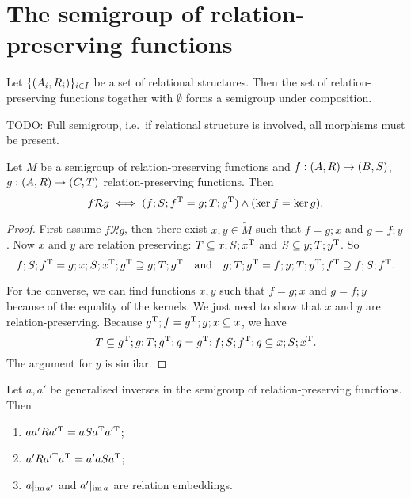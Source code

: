 \section{The semigroup of relation-preserving functions}
\begin{lemma}
Let $\{\sSet{A_i, R_i}\}_{i\in I}$ be a set of relational structures. Then the set of relation-preserving functions together with $\emptyset$ forms a semigroup under composition.
\end{lemma}


TODO: Full semigroup, i.e.\ if relational structure is involved, all morphisms must be present.
\begin{proposition}
Let $M$ be a semigroup of relation-preserving functions and $f: \sSet{A, R} \to \sSet{B,S}$, $g: \sSet{A, R} \to \sSet{C,T}$ relation-preserving functions. Then
\[ f\mathcal{R}g \iff (f;S;f^{\mathrm{T}} = g;T;g^{\mathrm{T}})\land (\ker f = \ker g). \]
\end{proposition}
\begin{proof}
First assume $f\mathcal{R}g$, then there exist $x,y\in \tilde{M}$ such that $f = g;x$ and $g = f;y$. Now $x$ and $y$ are relation preserving: $T \subseteq x;S;x^{\mathrm{T}}$ and $S \subseteq y;T;y^{\mathrm{T}}$. So
\[ f;S;f^{\mathrm{T}} = g;x;S;x^{\mathrm{T}};g^{\mathrm{T}} \supseteq g;T;g^{\mathrm{T}} \quad\text{and}\quad g;T;g^{\mathrm{T}} = f;y;T;y^{\mathrm{T}};f^{\mathrm{T}}  \supseteq f;S;f^{\mathrm{T}}. \]

For the converse, we can find functions $x,y$ such that $f = g;x$ and $g = f;y$ because of the equality of the kernels. We just need to show that $x$ and $y$ are relation-preserving. Because $g^{\mathrm{T}};f = g^{\mathrm{T}};g;x \subseteq x$, we have
\[ T \subseteq g^{\mathrm{T}};g;T;g^{\mathrm{T}};g = g^{\mathrm{T}};f;S;f^{\mathrm{T}};g \subseteq x;S;x^{\mathrm{T}}. \]
The argument for $y$ is similar.
\end{proof}
\begin{corollary} \label{relationPreservingGeneralisedInversesEmbeddings}
Let $a,a'$ be generalised inverses in the semigroup of relation-preserving functions. Then
\begin{enumerate}
\item $aa'R a^{\prime\mathrm{T}} = aSa^{\mathrm{T}} a^{\prime\mathrm{T}}$;
\item $a'R a^{\prime\mathrm{T}}a^{\mathrm{T}} = a'aSa^{\mathrm{T}}$;
\item $a|_{\operatorname{im} a'}$ and $a'|_{\operatorname{im} a}$ are relation embeddings.
\end{enumerate}
\end{corollary}
